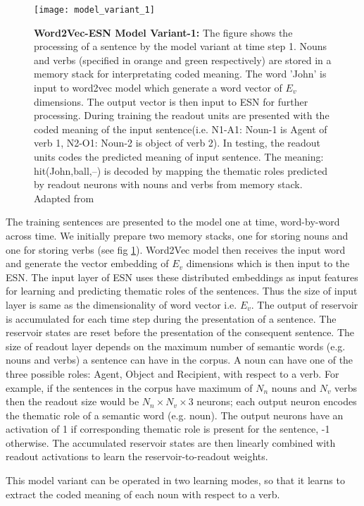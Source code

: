 \begin{figure}[hbtp]
\centering
\texttt{[image: model\_variant\_1]}
\caption{\textbf{Word2Vec-ESN Model Variant-1:} The figure shows the processing of a sentence by the model variant at time step 1. Nouns and verbs (specified in orange and green respectively) are stored in a memory stack for interpretating coded meaning. The word 'John' is input to word2vec model which generate a word vector of $E_{v}$ dimensions. The output vector is then input to ESN for further processing. During training the readout units are presented with the coded meaning of the input sentence(i.e. N1-A1: Noun-1 is Agent of verb 1, N2-O1: Noun-2 is object of verb 2). In testing, the readout units codes the predicted meaning of input sentence. The meaning: hit(John,ball,--) is decoded by mapping the thematic roles predicted by readout neurons with nouns and verbs from memory stack. Adapted from \cite{xavier:2013:RT}} 
\label{fig:model_variant_1}
\end{figure}

The training sentences are presented to the model one at time, word-by-word across time. We initially prepare two memory stacks, one for storing nouns and one for storing verbs (see fig \ref{fig:model_variant_1}). Word2Vec model then receives the input word and generate the vector embedding of $E_{v}$ dimensions which is then input to the ESN. The input layer of ESN uses these distributed embeddings as input features for learning and predicting thematic roles of the sentences. Thus the size of input layer is same as the dimensionality of word vector i.e. $E_{v}$. The output of reservoir is accumulated for each time step during the presentation of a sentence. The reservoir states are reset before the presentation of the consequent sentence. The size of readout layer depends on the maximum number of semantic words (e.g. nouns and verbs) a sentence can have in the corpus. A noun can have one of the three possible roles: Agent, Object and Recipient, with respect to a verb. For example, if the sentences in the corpus have maximum of $N_{n}$ nouns and $N_{v}$ verbs then the readout size would be $N_{n} \times N_{v} \times {3}$  neurons; each output neuron encodes the thematic role of a semantic word (e.g. noun). The output neurons have an activation of 1 if corresponding thematic role is present for the sentence, -1 otherwise. The accumulated reservoir states are then linearly combined with readout activations to learn the reservoir-to-readout weights.

This model variant can be operated in two learning modes, so that it learns to extract the coded meaning of each noun with respect to a verb.

